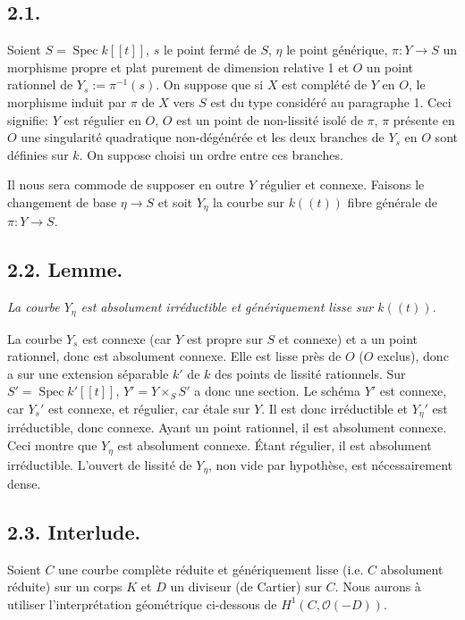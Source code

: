 \documentclass[11pt,leqno]{article}
\DeclareMathOperator{\Spec}{Spec}
\newcommand{\OO}{\mathcal O}
\begin{document}
\subsection*{2.1.}
Soient $S=\Spec k[[t]]$, $s$ le point fermé de $S$, $\eta$ le point générique, $\pi:Y\to S$ un morphisme propre et plat purement de dimension relative 1 et $O$ un point rationnel de $Y_s:=\pi^{-1}(s)$. On suppose que si $X$ est complété de $Y$ en $O$, le morphisme induit par $\pi$ de $X$ vers $S$ est du type considéré au paragraphe 1. Ceci signifie: $Y$ est régulier en $O$, $O$ est un point de non-lissité isolé de $\pi$, $\pi$ présente en $O$ une singularité quadratique non-dégénérée et les deux branches de $Y_s$ en $O$ sont définies sur $k$. On suppose choisi un ordre entre ces branches.

Il nous sera commode de supposer en outre $Y$ régulier et connexe. Faisons le changement de base $\eta\to S$ et soit $Y_\eta$ la courbe sur $k((t))$ fibre générale de $\pi:Y\to S$.

\subsection*{2.2. Lemme.}
\emph{La courbe $Y_\eta$ est absolument irréductible et génériquement lisse sur $k((t))$.}

La courbe $Y_s$ est connexe (car $Y$ est propre sur $S$ et connexe) et a un point rationnel, donc est absolument connexe. Elle est lisse près de $O$ ($O$ exclus),
\clearpage
donc a sur une extension séparable $k'$ de $k$ des points de lissité rationnels. Sur $S'=\Spec k'[[t]]$, $Y'=Y\times_SS'$ a donc une section. Le schéma $Y'$ est connexe, car $Y_s'$ est connexe, et régulier, car étale sur $Y$. Il est donc irréductible et $Y_\eta'$ est irréductible, donc connexe. Ayant un point rationnel, il est absolument connexe. Ceci montre que $Y_\eta$ est absolument connexe. Étant régulier, il est absolument irréductible. L'ouvert de lissité de $Y_\eta$, non vide par hypothèse, est nécessairement dense.

\subsection*{2.3. Interlude.}
Soient $C$ une courbe complète réduite et génériquement lisse (i.e. $C$ absolument réduite) sur un corps $K$ et $D$ un diviseur (de Cartier) sur $C$. Nous aurons à utiliser l'interprétation géométrique ci-dessous de $H^1(C,\OO(-D))$.
\end{document}
